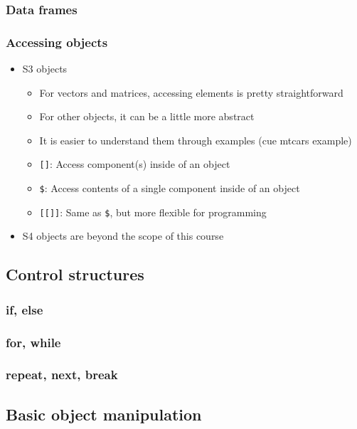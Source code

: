 \documentclass{beamer}
\begin{document}
\begin{frame}[fragile]
    \frametitle{Data frames}
    
\end{frame}


\begin{frame}[fragile]
    \frametitle{Accessing objects}
	\begin{itemize}
	  \item S3 objects
	    \begin{itemize}
	      \item For vectors and matrices, accessing elements is pretty straightforward
	      \item For other objects, it can be a little more abstract
	      \item It is easier to understand them through examples (cue mtcars example)
	      \item \texttt{[]}: Access component(s) inside of an object
	      \item \texttt{\$}: Access contents of a single component inside of an object
	      \item \texttt{[[]]}: Same as \texttt{\$}, but more flexible for programming
	    \end{itemize}
	  \item S4 objects are beyond the scope of this course
	\end{itemize}
\end{frame}


\subsection{Control structures}

\begin{frame}[fragile]
    \frametitle{if, else}
    
\end{frame}


\begin{frame}[fragile]
    \frametitle{for, while}
    
\end{frame}


\begin{frame}[fragile]
    \frametitle{repeat, next, break}
    
\end{frame}


\subsection{Basic object manipulation}
\end{document}
